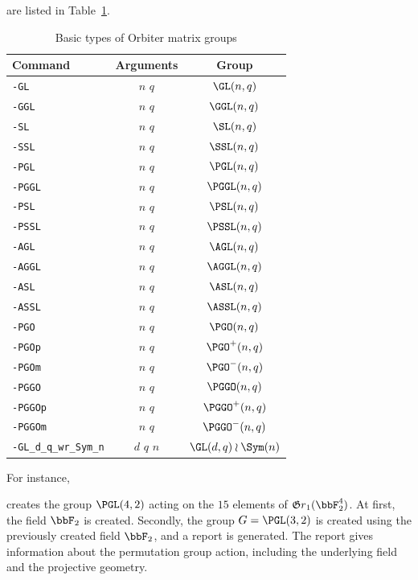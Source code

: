are listed in Table~\ref{tab:matrixgroups}.
\begin{table}
\begin{center}
\begin{tabular}{|l|c|c|}
\hline
Command & Arguments & Group \\
\hline
\hline
\verb'-GL' & $n$ $q$ & $\GL(n,q)$ \\
\hline
\verb'-GGL' & $n$ $q$ & $\GGL(n,q)$ \\
\hline
\verb'-SL' & $n$ $q$ & $\SL(n,q)$ \\
\hline
\verb'-SSL' & $n$ $q$ & $\SSL(n,q)$ \\
\hline
\verb'-PGL' & $n$ $q$ & $\PGL(n,q)$ \\
\hline
\verb'-PGGL' & $n$ $q$ & $\PGGL(n,q)$ \\
\hline
\verb'-PSL' & $n$ $q$ & $\PSL(n,q)$ \\
\hline
\verb'-PSSL' & $n$ $q$ & $\PSSL(n,q)$ \\
\hline
\verb'-AGL' & $n$ $q$ & $\AGL(n,q)$ \\
\hline
\verb'-AGGL' & $n$ $q$ & $\AGGL(n,q)$ \\
\hline
\verb'-ASL' & $n$ $q$ & $\ASL(n,q)$ \\
\hline
\verb'-ASSL' & $n$ $q$ & $\ASSL(n,q)$ \\
\hline
\verb'-PGO' & $n$ $q$ & $\PGO(n,q)$ \\
\hline
\verb'-PGOp' & $n$ $q$ & $\PGO^+(n,q)$ \\
\hline
\verb'-PGOm' & $n$ $q$ & $\PGO^-(n,q)$ \\
\hline
\verb'-PGGO' & $n$ $q$ & $\PGGO(n,q)$ \\
\hline
\verb'-PGGOp' & $n$ $q$ & $\PGGO^+(n,q)$ \\
\hline
\verb'-PGGOm' & $n$ $q$ & $\PGGO^-(n,q)$ \\
\hline
\verb'-GL_d_q_wr_Sym_n' & $d$ $q$ $n$ & $\GL(d,q) \wr \Sym(n)$ \\
\hline
\end{tabular}
\end{center}
\caption{\label{tab:matrixgroups}Basic types of Orbiter matrix groups}
\end{table}


\bigskip


For instance, 
{\tt

}
creates the group $\PGL(4,2)$ acting on the $15$ elements of ${\frak Gr}_1(\bbF_2^4)$. 
At first, the field $\bbF_2$ is created. 
Secondly, the group $G=\PGL(3,2)$ is created using the previously created field $\bbF_2$, 
and a report is generated.
The report gives information about the permutation group action, 
including the underlying field and the projective geometry.
\begin{mdframed}[style=MyFrame]

\end{mdframed}



